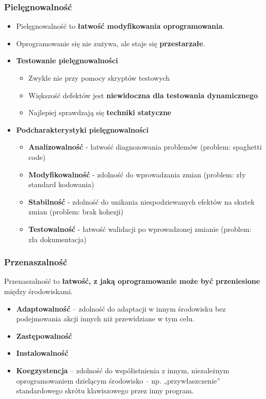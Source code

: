 \documentclass[../main.tex]{subfiles}
\begin{document}
    \subsubsection{Pielęgnowalność}
    \begin{itemize}
        \item Pielęgnowalność to \textbf{łatwość modyfikowania oprogramowania}.
        \item Oprogramowanie się nie zużywa, ale staje się \textbf{przestarzałe}.
        \item \textbf{Testowanie pielęgnowalności}
        \begin{itemize}
            \item Zwykle nie przy pomocy skryptów testowych
            \item Większość defektów jest \textbf{niewidoczna dla testowania dynamicznego}
            \item Najlepiej sprawdzają się \textbf{techniki statyczne}
        \end{itemize}
        \item \textbf{Podcharakterystyki pielęgnowalności}
        \begin{itemize}
            \item \textbf{Analizowalność} - łatwość diagnozowania problemów (problem: spaghetti code)
            \item \textbf{Modyfikowalność} - zdolność do wprowadzania zmian (problem: zły standard kodowania)
            \item \textbf{Stabilność} - zdolność do unikania niespodziewanych efektów na skutek zmian (problem: brak kohezji)
            \item \textbf{Testowalność} - łatwość walidacji po wprowadzonej zmianie (problem: zła dokumentacja)
        \end{itemize}
    \end{itemize}

    \subsubsection{Przenaszalność}
    Przenaszalność to \textbf{łatwość, z jaką oprogramowanie może być przeniesione} między środowiskami.
    \begin{itemize}
        \item \textbf{Adaptowalność} – zdolność do adaptacji w innym środowisku bez
        podejmowania akcji innych niż przewidziane w tym celu.
        \item \textbf{Zastępowalność}
        \item \textbf{Instalowalność}
        \item \textbf{Koegzystencja} – zdolność do współistnienia z innym, niezależnym oprogramowaniem dzielącym środowisko
        – np. „przywłaszczenie” standardowego skrótu klawiszowego przez inny program.
    \end{itemize}
\end{document}
